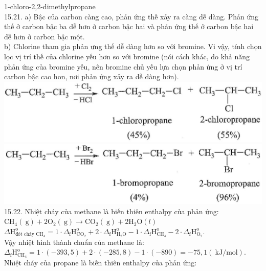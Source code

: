 \documentclass[10pt]{article}
\begin{document}
1-chloro-2,2-dimethylpropane\\
15.21. a) Bậc của carbon càng cao, phản ứng thế xảy ra càng dễ dàng. Phản ứng thế ở carbon bậc ba dễ hơn ở carbon bậc hai và phản ứng thế ở carbon bậc hai dễ hơn ở carbon bậc một.\\
b) Chlorine tham gia phản ưng thế dễ dàng hơn so với bromine. Vi vậy, tính chọn lọc vị trí thế của chlorine yếu hơn so với bromine (nói cách khác, do khả năng phản ứng của bromine yếu, nên bromine chủ yếu lựa chọn phản ứng ở vị trí carbon bậc cao hon, nơi phản ứng xảy ra dễ dàng hơn).\\
\includegraphics[max width=\textwidth, center]{2025_10_23_ed7118e3280f74e91193g-24}\\
\includegraphics[max width=\textwidth, center]{2025_10_23_ed7118e3280f74e91193g-24(1)}\\
15.22. Nhiệt cháy của methane là biến thiên enthalpy của phản ứng:\\
$\mathrm{CH}_{4}(\mathrm{~g})+2 \mathrm{O}_{2}(\mathrm{~g}) \longrightarrow \mathrm{CO}_{2}(\mathrm{~g})+2 \mathrm{H}_{2} \mathrm{O}(l)$\\
$\Delta \mathrm{H}_{\text {đót cháy } \mathrm{CH}_{4}}^{\mathrm{o}}=1 \cdot \Delta_{\mathrm{f}} \mathrm{H}_{\mathrm{CO}_{2}}^{\mathrm{o}}+2 \cdot \Delta_{\mathrm{f}} \mathrm{H}_{\mathrm{H}_{2} \mathrm{O}}^{\mathrm{o}}-1 \cdot \Delta_{\mathrm{f}} \mathrm{H}_{\mathrm{CH}_{4}}^{\mathrm{o}}-2 \cdot \Delta_{\mathrm{f}} \mathrm{H}_{\mathrm{O}_{2}}^{\mathrm{o}}$.\\
Vậy nhiệt hình thành chuẩn của methane là:\\
$\Delta_{\mathrm{f}} \mathrm{H}_{\mathrm{CH}_{4}}^{\mathrm{o}}=1 \cdot(-393,5)+2 \cdot(-285,8)-1 \cdot(-890)=-75,1(\mathrm{~kJ} / \mathrm{mol})$.\\
Nhiệt cháy của propane là biến thiên enthalpy của phản ứng:\\
\end{document}
